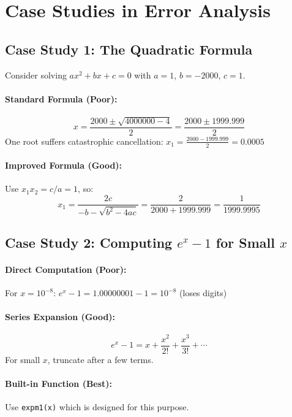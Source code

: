 \section{Case Studies in Error Analysis}
\label{sec:case-studies}

\subsection{Case Study 1: The Quadratic Formula}
\label{subsec:quadratic-case}

Consider solving $ax^2 + bx + c = 0$ with $a = 1$, $b = -2000$, $c = 1$.

\paragraph{Standard Formula (Poor):}
\[
    x = \frac{2000 \pm \sqrt{4000000 - 4}}{2} = \frac{2000 \pm 1999.999}{2}
\]
One root suffers catastrophic cancellation: $x_1 = \frac{2000 - 1999.999}{2} = 0.0005$

\paragraph{Improved Formula (Good):}
Use $x_1 x_2 = c/a = 1$, so:
\[
    x_1 = \frac{2c}{-b - \sqrt{b^2 - 4ac}} = \frac{2}{2000 + 1999.999} = \frac{1}{1999.9995}
\]

\subsection{Case Study 2: Computing \texorpdfstring{$e^x - 1$}{ex - 1} for Small \texorpdfstring{$x$}{x}}
\label{subsec:exp-case}

\paragraph{Direct Computation (Poor):}
For $x = 10^{-8}$: $e^x - 1 = 1.00000001 - 1 = 10^{-8}$ (loses digits)

\paragraph{Series Expansion (Good):}
\[
    e^x - 1 = x + \frac{x^2}{2!} + \frac{x^3}{3!} + \cdots
\]
For small $x$, truncate after a few terms.

\paragraph{Built-in Function (Best):}
Use \texttt{expm1(x)} which is designed for this purpose.

